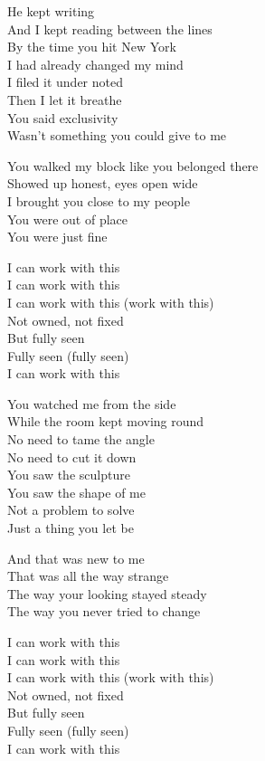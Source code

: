 \begin{lyrics}
He kept writing\\
And I kept reading between the lines\\
By the time you hit New York\\
I had already changed my mind\\
I filed it under noted\\
Then I let it breathe\\
You said exclusivity\\
Wasn't something you could give to me

You walked my block like you belonged there\\
Showed up honest, eyes open wide\\
I brought you close to my people\\
You were out of place\\
You were just fine

I can work with this\\
I can work with this\\
I can work with this (work with this)\\
Not owned, not fixed\\
But fully seen\\
Fully seen (fully seen)\\
I can work with this

You watched me from the side\\
While the room kept moving round\\
No need to tame the angle\\
No need to cut it down\\
You saw the sculpture\\
You saw the shape of me\\
Not a problem to solve\\
Just a thing you let be

And that was new to me\\
That was all the way strange\\
The way your looking stayed steady\\
The way you never tried to change

I can work with this\\
I can work with this\\
I can work with this (work with this)\\
Not owned, not fixed\\
But fully seen\\
Fully seen (fully seen)\\
I can work with this


\end{lyrics}
